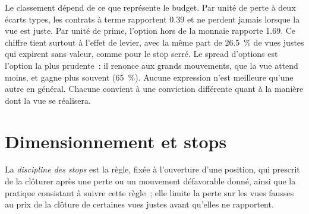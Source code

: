Le classement dépend de ce que représente le budget. Par unité de perte à deux écarts types, les contrats à terme rapportent 0.39 et ne perdent jamais lorsque la vue est juste. Par unité
de prime, l'option hors de la monnaie rapporte 1.69. Ce chiffre tient surtout à l'effet de levier, avec la même part de 26.5~\% de vues justes qui expirent sans valeur, comme pour le
stop serré. Le spread d'options est l'option la plus prudente~: il renonce aux grands mouvements, que la vue attend moins, et gagne plus souvent (65~\%). Aucune
expression n'est meilleure qu'une autre en général. Chacune convient à une conviction différente quant à la manière dont la vue se réalisera.

\begin{omfigure}

\label{fig:s2:discretionary-macro:expressions}
\end{omfigure}

\section{Dimensionnement et stops}

\begin{definition}\label{def:s2:discretionary-macro:stop}
La \emph{discipline des stops} est la règle, fixée à l'ouverture d'une position, qui prescrit de la clôturer après une perte ou un mouvement défavorable donné, ainsi que
la pratique consistant à suivre cette règle~; elle limite la perte sur les vues fausses au prix de la clôture de certaines vues justes avant qu'elles ne rapportent.
\end{definition}

